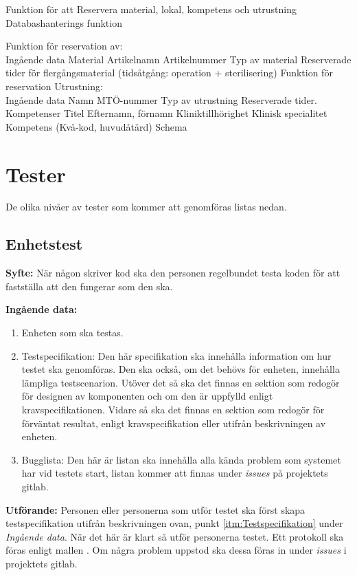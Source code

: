 \documentclass[a4paper,10pt]{article}
\begin{document}
Funktion för att Reservera material, lokal, kompetens och utrustning \\
Databashanterings funktion

Funktion för reservation av: \\
Ingående data 
	Material
	Artikelnamn
	Artikelnummer
	Typ av material
	Reserverade tider för flergångsmaterial (tidsåtgång: operation + sterilisering)
Funktion för reservation Utrustning: \\
Ingående data
	Namn
	MTÖ-nummer 
	Typ av utrustning
	Reserverade tider.
Kompetenser
Titel
Efternamn, förnamn
Kliniktillhörighet
Klinisk specialitet
Kompetens (Kvå-kod, huvudåtärd)
Schema


\section{Tester}
De olika nivåer av tester som kommer att genomföras listas nedan.
\subsection{Enhetstest}
  \textbf{Syfte:}
  När någon skriver kod ska den personen regelbundet testa koden för att fastställa att den fungerar som den ska.

  \textbf{Ingående data:}
        \begin{enumerate}
            \item Enheten som ska testas.
            \item \label{itm:Testspecifikation} Testspecifikation: Den här specifikation ska innehålla information om hur testet ska genomföras. Den ska också, om det behövs för enheten, innehålla lämpliga testscenarion. Utöver det så ska det finnas en sektion som redogör för designen av komponenten och om den är uppfylld enligt kravspecifikationen. Vidare så ska det finnas en sektion som redogör för förväntat resultat, enligt kravspecifikation eller utifrån beskrivningen av enheten.
            \item Bugglista: Den här är listan ska innehålla alla kända problem som systemet har vid testets start, listan kommer att finnas under \emph{issues} på projektets gitlab.
        \end{enumerate}
    \textbf{Utförande:} Personen eller personerna som utför testet ska först skapa testspecifikation utifrån beskrivningen ovan, punkt \ref{itm:Testspecifikation} under \emph{Ingående data}. När det här är klart så utför personerna testet. Ett protokoll ska föras enligt mallen . Om några problem uppstod ska dessa föras in under \emph{issues} i projektets gitlab.
\end{document}
